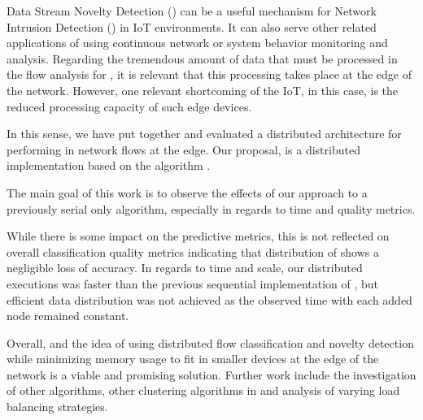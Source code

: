 Data Stream Novelty Detection (\nd) can be a useful mechanism for Network
Intrusion Detection (\nids) in IoT environments.
It can also serve other related applications of \nd using continuous network or
system behavior monitoring and analysis.
Regarding the tremendous amount of data that must be processed in the flow
analysis for \nd, it is relevant that this processing takes place at the edge of
the network.
However, one relevant shortcoming of the IoT, in this case, is the reduced
processing capacity of such edge devices.

In this sense, we have put together and evaluated a distributed architecture for
performing \nd in network flows at the edge.
Our proposal, \mfog is a distributed \nd implementation based on the \nd
algorithm \minas.

The main goal of this work is to observe the effects of our approach to a
previously serial only algorithm, especially in regards to time and quality
metrics.

While there is some impact on the predictive metrics, this is not reflected on
overall classification quality metrics indicating that distribution of \minas
shows a negligible loss of accuracy.
In regards to time and scale, our distributed executions was faster than the
previous sequential implementation of \minas, but efficient data distribution
was not achieved as the observed time with each added node remained constant.

Overall, \mfog and the idea of using distributed flow classification and novelty
detection while minimizing memory usage to fit in smaller devices at the edge of
the network is a viable and promising solution.
Further work include the investigation of other \nd algorithms, other clustering
algorithms in \minas and analysis of varying load balancing strategies.
